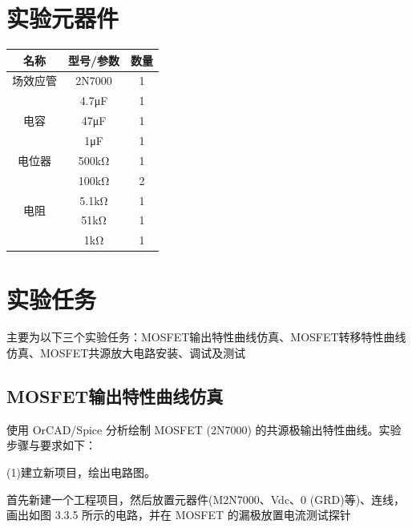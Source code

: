 \documentclass[a4paper,11pt,UTF8]{article}
\numberwithin{equation}{subsection}
\begin{document}
\section{实验元器件}
\begin{table}[h]
	\centering
	\begin{tabular}{|c|c|c|}
		\hline
		名称 & 型号/参数 & 数量\\
		\hline
		场效应管 & 2N7000 & 1\\
		\hline
		\multirow{3}{*}{电容} & 4.7μF & 1 \\
		\cline{2-3}
		 & 47μF & 1\\
		\cline{2-3}
		 & 1μF & 1\\
		\hline
		电位器 & 500kΩ & 1\\
		\hline
		\multirow{4}{*}{电阻} & 100kΩ & 2 \\
		\cline{2-3}
		 & 5.1kΩ & 1\\
		\cline{2-3}
		 & 51kΩ & 1\\
		\cline{2-3}
 		 & 1kΩ & 1\\
		\hline 		
	\end{tabular}
\end{table}
\section{实验任务}
主要为以下三个实验任务：MOSFET输出特性曲线仿真、MOSFET转移特性曲线仿真、MOSFET共源放大电路安装、调试及测试
\subsection{MOSFET输出特性曲线仿真}
使用 OrCAD/Spice 分析绘制 MOSFET (2N7000) 的共源极输出特性曲线。实验步骤与要求如下：

(1)建立新项目，绘出电路图。

首先新建一个工程项目，然后放置元器件(M2N7000、Vdc、0 (GRD)等)、连线，画出如图 3.3.5 所示的电路，并在 MOSFET 的漏极放置电流测试探针
\end{document}
